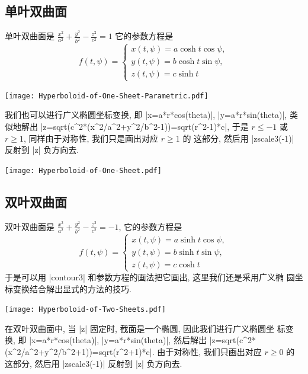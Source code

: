 \documentclass[nofonts,CJKnormalspaces]{ctexbook}
\let\leq\leqslant
\let\geq\geqslant
\begin{document}
\subsection{单叶双曲面}
单叶双曲面是
$\frac{x^{2}}{a^{2}}+\frac{y^{2}}{b^{2}}-\frac{z^{2}}{c^{2}}=1$
它的参数方程是
\begin{equation}
  f(t,\psi)=\left\{
    \begin{array}{ll}
      x(t,\psi)=a\cosh t\cos\psi,\\
      y(t,\psi)=b\cosh t\sin\psi,\\
      z(t,\psi)=c\sinh t
    \end{array}\right.
\end{equation}
\begin{center}\texttt{[image: Hyperboloid-of-One-Sheet-Parametric.pdf]}\end{center}%

我们也可以进行广义椭圆坐标变换, 即 |x=a*r*cos(theta)|, |y=a*r*sin(theta)|,
类似地解出
|z=sqrt(c^2*(x^2/a^2+y^2/b^2-1))=sqrt(r^2-1)*c|, 于是
$r\leq -1$ 或 $r\geq 1$, 同样由于对称性, 我们只是画出对应 $r\geq 1$ 的
这部分, 然后用 |zscale3(-1)| 反射到 |z| 负方向去.
\begin{center}\texttt{[image: Hyperboloid-of-One-Sheet.pdf]}\end{center}%


\subsection{双叶双曲面}
双叶双曲面是
$\frac{x^{2}}{a^{2}}+\frac{y^{2}}{b^{2}}-\frac{z^{2}}{c^{2}}=-1$,
它的参数方程是
\begin{equation}
  f(t,\psi)=\left\{
    \begin{array}{ll}
      x(t,\psi)=a\sinh t\cos\psi,\\
      y(t,\psi)=b\sinh t\sin\psi,\\
      z(t,\psi)=c\cosh t
    \end{array}\right.
\end{equation}
于是可以用 |contour3| 和参数方程的画法把它画出, 这里我们还是采用广义椭
圆坐标变换结合解出显式的方法的技巧.
\begin{center}\texttt{[image: Hyperboloid-of-Two-Sheets.pdf]}\end{center}%

在双叶双曲面中, 当 |z| 固定时, 截面是一个椭圆, 因此我们进行广义椭圆坐
标变换, 即 |x=a*r*cos(theta)|, |y=a*r*sin(theta)|, 然后解出
|z=sqrt(c^2*(x^2/a^2+y^2/b^2+1))=sqrt(r^2+1)*c|. 由于对称性, 我们只画出对应 $r\geq 0$ 的
这部分, 然后用 |zscale3(-1)| 反射到 |z| 负方向去.
\end{document}
